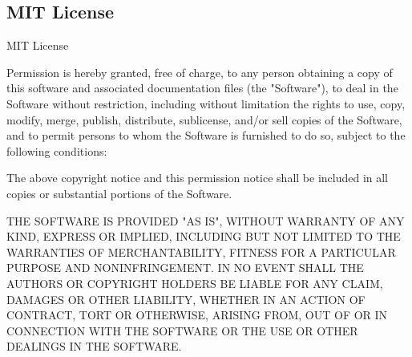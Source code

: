 \newpage
\subsection{MIT License}
\label{MITLicense}
\begin{center}
	MIT License
\end{center}

Permission is hereby granted, free of charge, to any person obtaining a copy of this software and associated documentation files (the "Software"), to deal in the Software without restriction, including without limitation the rights to use, copy, modify, merge, publish, distribute, sublicense, and/or sell copies of the Software, and to permit persons to whom the Software is furnished to do so, subject to the following conditions:

\vparasmall
The above copyright notice and this permission notice shall be included in all copies or substantial portions of the Software.

\vparasmall
THE SOFTWARE IS PROVIDED "AS IS", WITHOUT WARRANTY OF ANY KIND, EXPRESS OR IMPLIED, INCLUDING BUT NOT LIMITED TO THE WARRANTIES OF MERCHANTABILITY, FITNESS FOR A PARTICULAR PURPOSE AND NONINFRINGEMENT. IN NO EVENT SHALL THE AUTHORS OR COPYRIGHT HOLDERS BE LIABLE FOR ANY CLAIM, DAMAGES OR OTHER LIABILITY, WHETHER IN AN ACTION OF CONTRACT, TORT OR OTHERWISE, ARISING FROM, OUT OF OR IN CONNECTION WITH THE SOFTWARE OR THE USE OR OTHER DEALINGS IN THE SOFTWARE.



%
%
%
%
%
%
%
%
%
%



